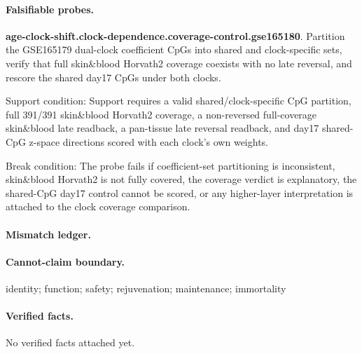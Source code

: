 \paragraph{Falsifiable probes.}
\textbf{age-clock-shift.clock-dependence.coverage-control.gse165180}. Partition the GSE165179 dual-clock coefficient CpGs into shared and clock-specific sets, verify that full skin\&blood Horvath2 coverage coexists with no late reversal, and rescore the shared day17 CpGs under both clocks.

Support condition: Support requires a valid shared/clock-specific CpG partition, full 391/391 skin\&blood Horvath2 coverage, a non-reversed full-coverage skin\&blood late readback, a pan-tissue late reversal readback, and day17 shared-CpG z-space directions scored with each clock's own weights.

Break condition: The probe fails if coefficient-set partitioning is inconsistent, skin\&blood Horvath2 is not fully covered, the coverage verdict is explanatory, the shared-CpG day17 control cannot be scored, or any higher-layer interpretation is attached to the clock coverage comparison.

\paragraph{Mismatch ledger.}
\paragraph{Cannot-claim boundary.} identity; function; safety; rejuvenation; maintenance; immortality

\paragraph{Verified facts.}
No verified facts attached yet.
